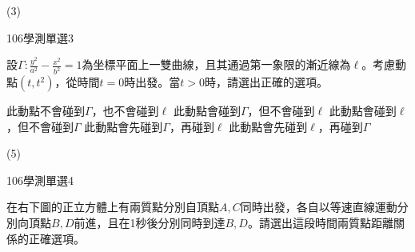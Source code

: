 \begin{QUESTIONS}
\begin{QUESTION}
\begin{QBODY}
\begin{QOPS}
			\end{QOPS}
        \end{QBODY}
        \begin{QFROMS}
        \end{QFROMS}
        \begin{QTAGS}\end{QTAGS}
        \begin{QANS}
            (3)
        \end{QANS}
        \begin{QSOLLIST}
        \end{QSOLLIST}
        \begin{QEMPTYSPACE}
        \end{QEMPTYSPACE}
    \end{QUESTION}
    \begin{QUESTION}
        \begin{ExamInfo}{106}{學測}{單選}{3}
        \end{ExamInfo}
        \begin{ExamAnsRateInfo}{38}{71}{34}{9}
        \end{ExamAnsRateInfo}
        \begin{QBODY}
			設$\Gamma :\frac{{{y}^{2}}}{{{a}^{2}}}-\frac{{{x}^{2}}}{{{b}^{2}}}=1$為坐標平面上一雙曲線，且其通過第一象限的漸近線為$\ell $。考慮動點$(t,{{t}^{2}})$，從時間$t=0$時出發。當$t>0$時，請選出正確的選項。
			\begin{QOPS}
			\QOP 此動點不會碰到$\Gamma $，也不會碰到$\ell $
			\QOP 此動點會碰到$\Gamma $，但不會碰到$\ell $
			\QOP 此動點會碰到$\ell $，但不會碰到$\Gamma $
			\QOP 此動點會先碰到$\Gamma $，再碰到$\ell $
			\QOP 此動點會先碰到$\ell $，再碰到$\Gamma $
			\end{QOPS}
        \end{QBODY}
        \begin{QFROMS}
        \end{QFROMS}
        \begin{QTAGS}\end{QTAGS}
        \begin{QANS}
            (5)
        \end{QANS}
        \begin{QSOLLIST}
        \end{QSOLLIST}
        \begin{QEMPTYSPACE}
        \end{QEMPTYSPACE}
    \end{QUESTION}
    \begin{QUESTION}
        \begin{ExamInfo}{106}{學測}{單選}{4}
        \end{ExamInfo}
        \begin{ExamAnsRateInfo}{55}{89}{60}{16}
        \end{ExamAnsRateInfo}
        \begin{QBODY}
            在右下圖的正立方體上有兩質點分別自頂點$A,C$同時出發，各自以等速直線運動分別向頂點$B,D$前進，且在1秒後分別同時到達$B,D$。請選出這段時間兩質點距離關係的正確選項。
        

\end{QBODY}
\end{QUESTION}
\end{QUESTIONS}
